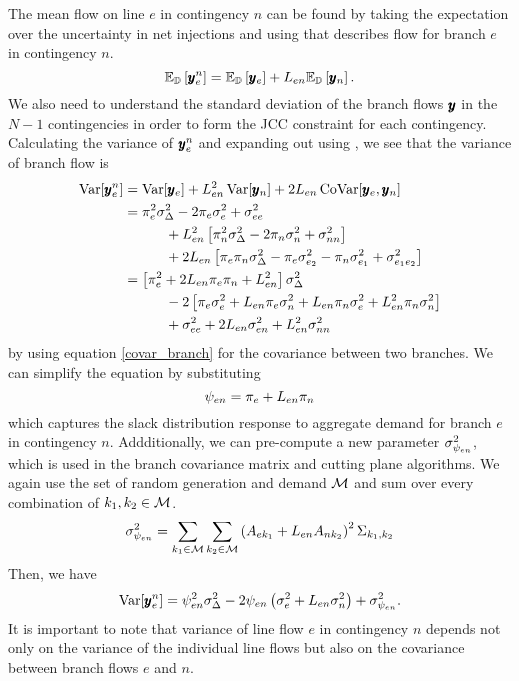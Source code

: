The mean flow on line $e$ in contingency $n$ can be found by taking the expectation over the uncertainty in net injections and using  that describes flow for branch $e$ in contingency $n$.
\begin{equation}
\mathbb{E}_{\mathbb{D}} \left[ \pmb{y}_e^n \right] =  \mathbb{E}_{\mathbb{D}} \left[ \pmb{y}_e \right]  + L_{en} \mathbb{E}_{\mathbb{D}} \left[ \pmb{y}_n \right].
\end{equation}
We also need to understand the standard deviation of the branch flows $\pmb{y}$  in the $N-1$ contingencies in order to form the JCC constraint for each contingency.  Calculating the variance of $\pmb{y}_e^n$ and expanding out using , we see that the variance of branch flow is
\begin{subequations}
\begin{align}
 \operatorname{Var}[\pmb{y}_e^n] &= \operatorname{Var}[\pmb{y}_e] + L^2_{e n} \operatorname{Var}[ \pmb{y}_n ] + 2 L_{e n} \operatorname{CoVar}[ \pmb{y}_e, \pmb{y}_n ] \\
 &= \pi_e^2 \sigma_\Delta^2 - 2 \pi_e \sigma^2_e + \sigma^2_{ee} \nonumber \\
 &\hspace{30pt} + L_{en}^2 \left[ \pi_n^2 \sigma_\Delta^2 - 2 \pi_n \sigma^2_n + \sigma^2_{nn} \right] \nonumber \\
 &\hspace{30pt}+ 2 L_{en} \left[ \pi_{e} \pi_{n} \sigma_\Delta^2 -  \pi_{e} \sigma_{e_2}^2 - \pi_{n} \sigma_{e_1}^2   + \sigma_{e_1 e_2}^2 \right]  \\
 &= \left[ \pi_e^2 + 2 L_{en} \pi_e \pi_n + L_{en}^2 \right] \sigma_\Delta^2 \nonumber\\
 &\hspace{30pt} - 2 \left[ \pi_e \sigma^2_e + L_{en} \pi_e \sigma^2_n + L_{en} \pi_n \sigma^2_e + L_{en}^2 \pi_n \sigma^2_n \right]  \nonumber \\
&\hspace{30pt} +  \sigma^2_{ee} + 2 L_{en} \sigma^2_{en} + L_{en}^2 \sigma^2_{nn}
\end{align}
\end{subequations}
by using equation \ref{covar_branch} for the covariance between two branches.  We can simplify the equation by substituting
\begin{equation}
\psi_{en} = \pi_e + L_{en} \pi_n
\end{equation}
 which captures the slack distribution response to aggregate demand for branch $e$ in contingency $n$. Addditionally, we can pre-compute a new parameter $\sigma^2_{\psi_{en}}$, which is used in the branch covariance matrix and cutting plane algorithms.  We again use the set of random generation and demand $\mathcal{M}$ and sum over every combination of $k_1,k_2 \in \mathcal{M}$.
\begin{equation}
\sigma^2_{\psi_{en}} = \sum_{k_1 \in \mathcal{M}} \sum_{k_2 \in \mathcal{M}} \left(A_{ek_1} + L_{en} A_{nk_2}\right)^2 \Sigma_{k_1,k_2}
\end{equation} 
Then, we have
\begin{equation}\label{n1var}
\operatorname{Var}[\pmb{y}_e^n] =\psi_{en}^2 \sigma_\Delta^2 - 2 \psi_{en} \left( \sigma^2_e + L_{en} \sigma^2_n \right) + \sigma^2_{\psi_{en}}.
\end{equation}
  It is important to note that variance of line flow $e$ in contingency $n$ depends not only on the variance of the individual line flows but also on the covariance between branch flows $e$ and $n$.  

